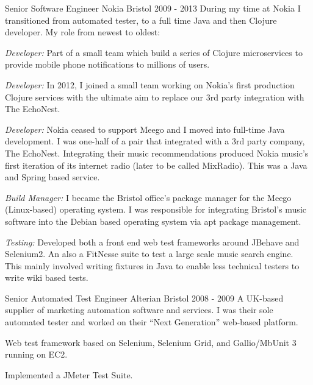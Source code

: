 \begin{cventries}
  \cventrypara
    {Senior Software Engineer} %
    {Nokia } %
    {Bristol} %
    {2009  - 2013} %
    {During my time at Nokia I transitioned from automated tester, to a full time Java and then Clojure developer. My role from newest to oldest:}
    {
      \begin{cvitems} %
        \item {\emph{Developer:} Part of a small team which build a series of Clojure microservices to provide mobile phone notifications to millions of users.}
        \item {\emph{Developer:} In 2012, I joined a small team working on Nokia's first production Clojure services with the ultimate aim to replace our 3rd party integration with The EchoNest.}
        \item {\emph{Developer:} Nokia ceased to support Meego and I moved into full-time Java development. I was one-half of a pair that integrated with a 3rd party company, The EchoNest. Integrating their music recommendations produced Nokia music’s first iteration of its internet radio (later to be called MixRadio). This was a Java and Spring based service.}
        \item {\emph{Build Manager:} I became the Bristol office's package manager for the Meego (Linux-based) operating system. I was responsible for integrating Bristol's music software into the Debian based operating system via apt package management.}
        \item {\emph{Testing:} Developed both a front end web test frameworks around JBehave and Selenium2. An also a  FitNesse suite to test a large scale music search engine. This mainly involved writing fixtures in Java to enable less technical testers to write wiki based tests.}
      \end{cvitems}
    }

  \cventrypara
    {Senior Automated Test Engineer} %
    {Alterian} %
    {Bristol} %
    {2008  - 2009} %
    {A UK-based supplier of marketing automation software and services. I was their sole automated tester and worked on their “Next Generation” web-based platform.}
    {
      \begin{cvitems} %
        \item {Web test framework based on Selenium, Selenium Grid, and Gallio/MbUnit 3 running on EC2.}
        \item {Implemented a JMeter Test Suite.}
      \end{cvitems}
    }


\end{cventries}
